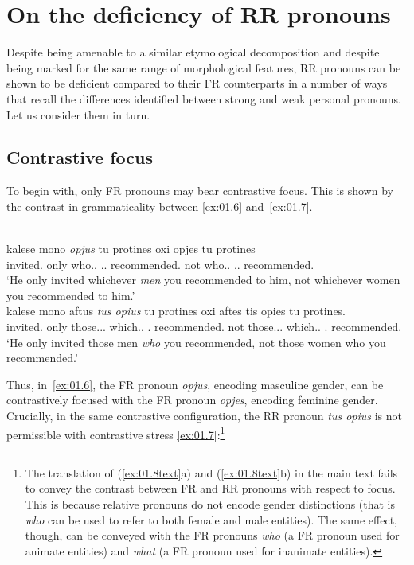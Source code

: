 \documentclass[output=paper]{langsci/langscibook}
\begin{document}
\section{On the deficiency of RR pronouns}\label{sec:01.3}

Despite being amenable to a similar etymological decomposition and despite
being marked for the same range of morphological features, \gls{RR} pronouns
can be shown to be deficient compared to their \gls{FR} counterparts in a
number of ways that recall the differences identified between strong and weak
personal pronouns. Let us consider them in turn.

\subsection{Contrastive focus}
To begin with, only \gls{FR}
pronouns may bear contrastive
focus. This is shown by the contrast in
grammaticality between \eqref{ex:01.6} and~\eqref{ex:01.7}.

\ea {}\label{ex:01.6}\\
	\gll kalese mono \emph{opjus} tu protines oxi opjes tu protines\\
		invited.\Tsg{} only who.\M{}.\Pl{} \Cl.\Tsg.\M{} recommended.\Ssg{} not who.\glossF.\Pl{} \Cl.\Tsg.\M{} recommended.\Ssg{}\\
	\glt \enquote*{He only invited whichever \emph{men} you recommended to him, not whichever women you recommended to him.}
\ex {}\label{ex:01.7}\\
    \gll \llap{*}kalese mono aftus \emph{tus opius} tu protines oxi aftes {tis opies} tu protines.\\
    invited.\Tsg{} only those.\M.\Pl.\Acc{} which.\M.\Pl{} \Cl.\Tsg{}
    recommended.\Ssg{} not those.\glossF.\Pl.\Acc{} which.\glossF.\Pl{} \Cl.\Tsg{} recommended.\Ssg{}\\
    \glt *\enquote*{He only invited those men \emph{who} you recommended, not
    those women who you recommended.}
\z

Thus, in~\eqref{ex:01.6}, the \gls{FR} pronoun \emph{opjus}, encoding masculine gender,
can be contrastively focused with the \gls{FR} pronoun \emph{opjes}, encoding
feminine gender. Crucially, in the same contrastive configuration, the
\gls{RR} pronoun \emph{tus opius} is not permissible with contrastive stress
\eqref{ex:01.7}:\footnote{The  translation of (\ref{ex:01.8text}a) and
    (\ref{ex:01.8text}b) in the main text fails to convey the
    contrast between \gls{FR} and \gls{RR} pronouns with respect to focus. This
    is because  relative pronouns do not encode gender
    distinctions (that is \emph{who} can be used to refer to both female and
    male entities). The same effect, though, can be conveyed with the
     \gls{FR} pronouns \emph{who} (a \gls{FR} pronoun used for
    animate entities) and \emph{what} (a \gls{FR} pronoun used for inanimate
    entities).}
\end{document}
